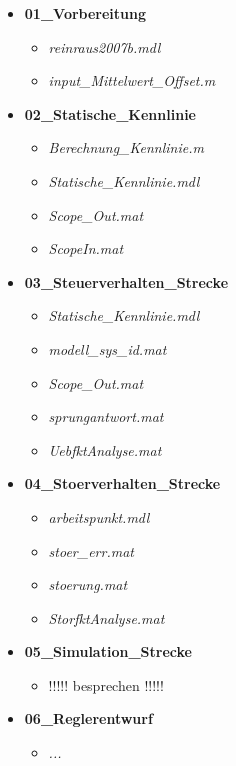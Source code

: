 \documentclass[11pt, a4paper,parskip=half]{article}
\begin{document}
\begin{itemize}
\item \textbf{01\_Vorbereitung}
	\begin{itemize}
	\item \textit{reinraus2007b.mdl}
	\item \textit{input\_Mittelwert\_Offset.m}
	\end{itemize}
	
\item \textbf{02\_Statische\_Kennlinie}
	\begin{itemize}
	\item \textit{Berechnung\_Kennlinie.m}
	\item \textit{Statische\_Kennlinie.mdl}
	\item \textit{Scope\_Out.mat}
	\item \textit{ScopeIn.mat}
	\end{itemize}
	
\item \textbf{03\_Steuerverhalten\_Strecke}
	\begin{itemize}
	\item \textit{Statische\_Kennlinie.mdl}
	\item \textit{modell\_sys\_id.mat}
	\item \textit{Scope\_Out.mat}
	\item \textit{sprungantwort.mat}
	\item \textit{UebfktAnalyse.mat}
	\end{itemize}
	
\item \textbf{04\_Stoerverhalten\_Strecke}
	\begin{itemize}
	\item \textit{arbeitspunkt.mdl}
	\item \textit{stoer\_err.mat}
	\item \textit{stoerung.mat}
	\item \textit{StorfktAnalyse.mat}

	\end{itemize}
	
\item \textbf{05\_Simulation\_Strecke}
	\begin{itemize}
	\item !!!!! besprechen !!!!!
	\end{itemize}
	
\item \textbf{06\_Reglerentwurf}
	\begin{itemize}
	\item \textit{...}
	\end{itemize}
	

\end{itemize}
\end{document}

